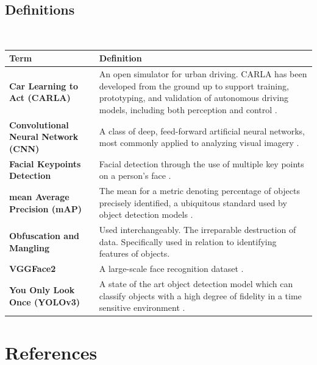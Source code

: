 \documentclass[onecolumn, draftclsnofoot,10pt, compsoc]{IEEEtran}
\begin{document}
\subsection{Definitions}
\\
\begin{center}
  \begin{tabular}{ | l | p{10cm} | } 
    \hline \textbf{Term} & \textbf{Definition} \\ \hline
    \textbf{Car Learning to Act (CARLA)} & An open simulator for urban driving. CARLA has been developed from the ground up to support training, prototyping, and validation of autonomous driving models, including both perception and control \cite{Carla}. \\ \hline 
    \textbf{Convolutional Neural Network (CNN)} & A class of deep, feed-forward artificial neural networks, most commonly applied to analyzing visual imagery \cite{CNN}. \\ \hline
    \textbf{Facial Keypoints Detection} & Facial detection through the use of multiple key points on a person’s face \cite{VGGFace2}. \\ \hline
    \textbf{mean Average Precision (mAP)} & The mean for a metric denoting percentage of objects precisely identified, a ubiquitous standard used by object detection models \cite{YOLOv3}. \\ \hline
    \textbf{Obfuscation and Mangling} & Used interchangeably. The irreparable destruction of data. Specifically used in relation to identifying features of objects. \\ \hline
    \textbf{VGGFace2} & A large-scale face recognition dataset \cite{VGGFace2}. \\ \hline
    \textbf{You Only Look Once (YOLOv3)} & A state of the art object detection model which can classify objects with a high degree of fidelity in a time sensitive environment \cite{YOLOv3}. \\ \hline
  \end{tabular}
\end{center}

\section{References}
\let\oldaddcontentsline\addcontentsline%
\renewcommand{\addcontentsline}[3]{}%
  

\let\addcontentsline\oldaddcontentsline%
\end{document}
